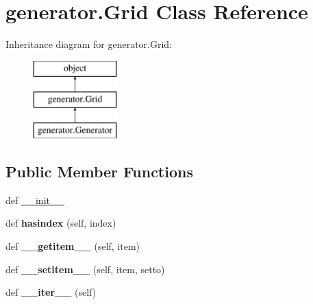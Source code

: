 \hypertarget{classgenerator_1_1_grid}{}\section{generator.\+Grid Class Reference}
\label{classgenerator_1_1_grid}
Inheritance diagram for generator.\+Grid\+:\begin{figure}[H]
\begin{center}
\leavevmode
\includegraphics[height=3.000000cm]{classgenerator_1_1_grid}
\end{center}
\end{figure}
\subsection*{Public Member Functions}
\begin{DoxyCompactItemize}
\item 
def \hyperlink{classgenerator_1_1_grid_a6eecadba0e4d632bbd153c4328c8c0d8}{\+\_\+\+\_\+init\+\_\+\+\_\+}
\item 
\hypertarget{classgenerator_1_1_grid_ae344e126ba2d0955237c73748c3a5c6f}{}def {\bfseries hasindex} (self, index)\label{classgenerator_1_1_grid_ae344e126ba2d0955237c73748c3a5c6f}

\item 
\hypertarget{classgenerator_1_1_grid_ad484be919641c1118283289d81fb1789}{}def {\bfseries \+\_\+\+\_\+getitem\+\_\+\+\_\+} (self, item)\label{classgenerator_1_1_grid_ad484be919641c1118283289d81fb1789}

\item 
\hypertarget{classgenerator_1_1_grid_affd54c3de428c9279959b91355f0fcc8}{}def {\bfseries \+\_\+\+\_\+setitem\+\_\+\+\_\+} (self, item, setto)\label{classgenerator_1_1_grid_affd54c3de428c9279959b91355f0fcc8}

\item 
\hypertarget{classgenerator_1_1_grid_a2dc3df6c8d3af4d85f95db647db3e210}{}def {\bfseries \+\_\+\+\_\+iter\+\_\+\+\_\+} (self)\label{classgenerator_1_1_grid_a2dc3df6c8d3af4d85f95db647db3e210}

\end{DoxyCompactItemize}
